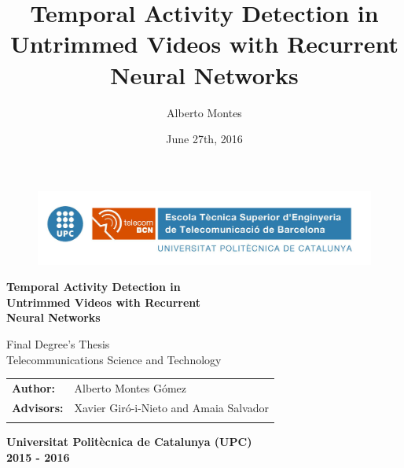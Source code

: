 \documentclass[11pt,a4paper,titlepage]{report}
\title{Temporal Activity Detection in Untrimmed Videos with Recurrent Neural Networks}
\author{Alberto Montes}
\date{June 27th, 2016}
\begin{document}
\begin{titlepage}

	\begin{center}
		\begin{figure}[ht]
		\centering
			\includegraphics[width=1\textwidth]{img/logo/logo_upc}
		\end{figure}
		\vspace{1cm}

		{
		\textbf{\Huge Temporal Activity Detection in \\
        Untrimmed Videos with Recurrent \\
        Neural Networks \\}
		}

		\vspace*{0.3in}
		\vspace*{0.1in}
		{
        \Large  Final Degree's Thesis \\
        Telecommunications Science and Technology \\}
		\vspace{5cm}
		\begin{tabular}{ll}

			\large{\textbf{Author:}}	&
			\large{Alberto Montes Gómez} \\

			\large{\textbf{Advisors:}}	&
			\large{Xavier Giró-i-Nieto and Amaia Salvador} \\
			\vspace{1cm}
		\end{tabular}

        \vspace*{1.85in}
		\large{\textbf{Universitat Politècnica de Catalunya (UPC)}}\\
		\large{\textbf{2015 - 2016}}\\
	\end{center}
\end{titlepage}






\tableofcontents
\listoffigures
\listoftables







\appendix





\end{document}
